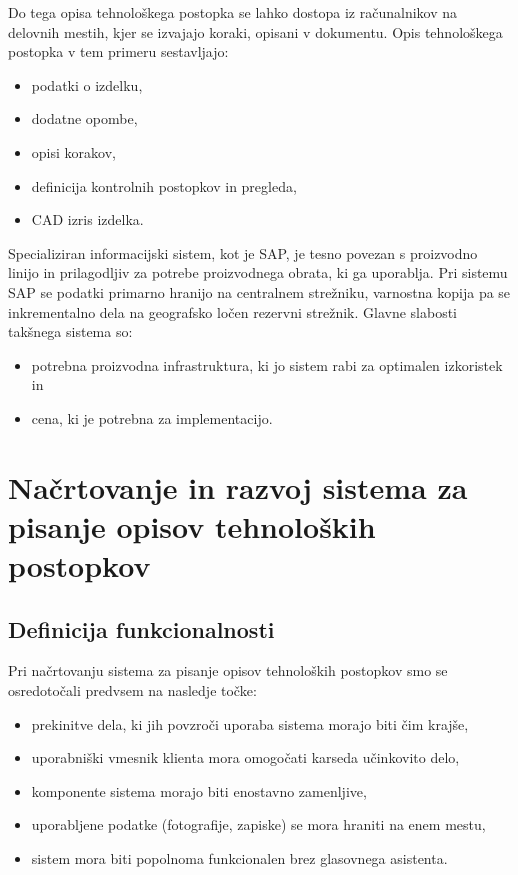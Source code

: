\documentclass[a4paper, 12pt]{book}
\begin{document}
	Do tega opisa tehnološkega postopka se lahko dostopa iz računalnikov na delovnih mestih, kjer se izvajajo koraki, opisani v dokumentu.
	Opis tehnološkega postopka v tem primeru sestavljajo:
	\begin{itemize}
		\item podatki o izdelku,
		\item dodatne opombe,
		\item opisi korakov,
		\item definicija kontrolnih postopkov in pregleda, 
		\item CAD izris izdelka.
	\end{itemize}

	Specializiran informacijski sistem, kot je SAP, je tesno povezan s proizvodno linijo in prilagodljiv za potrebe proizvodnega obrata, ki ga uporablja.
	Pri sistemu SAP se podatki primarno hranijo na centralnem strežniku, varnostna kopija pa se inkrementalno dela na geografsko ločen rezervni strežnik.
	Glavne slabosti takšnega sistema so:
	\begin{itemize}
		\item potrebna proizvodna infrastruktura, ki jo sistem rabi za optimalen izkoristek in
		\item cena, ki je potrebna za implementacijo.
	\end{itemize}


	\chapter{Načrtovanje in razvoj sistema za pisanje opisov tehnoloških postopkov}

	\section{Definicija funkcionalnosti}

	Pri načrtovanju sistema za pisanje opisov tehnoloških postopkov smo se osredotočali predvsem na nasledje točke:
	\begin{itemize}
		\item prekinitve dela, ki jih povzroči uporaba sistema morajo biti čim krajše,
		\item uporabniški vmesnik klienta mora omogočati karseda učinkovito delo,
		\item komponente sistema morajo biti enostavno zamenljive,
		\item uporabljene podatke (fotografije, zapiske) se mora hraniti na enem mestu,
		\item sistem mora biti popolnoma funkcionalen brez glasovnega asistenta.
	\end{itemize}
\end{document}
